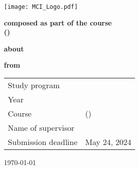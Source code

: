 
\thispagestyle{empty}
\thispdfpagelabel{} %
\begin{center}
	\textbf{\Huge \university}\par
	\vspace{8ex}\par
	\textbf{\LARGE \department}\par
	\vspace{4ex}\par
	\textbf{\Large \studyProgram}\par
	\vspace{4ex}\par
	\texttt{[image: MCI\_Logo.pdf]}\par
	\vspace{4ex}\par
	\textbf{\LARGE \docType}\par
	\vspace{2ex}\par
	\textbf{composed as part of the course\\[0.5ex] \courseName{} (\courseCode)}\par
	\vspace{4ex}\par
	\textbf{about}\par
	\vspace{4ex}\par
	\textbf{\LARGE \docTitle}\par
	\vspace{4ex}\par
	\textbf{from}\par
	\vspace{4ex}\par
	\textbf{\Large \href{\authorContact}{\authorName}}
\end{center}
\vspace{4ex}
\begin{tabular}{ll}
	Study program & \studyProgram\\[0.5ex]
	Year & \studyYear\\[0.5ex]
	Course & \courseName{} (\courseCode)\\[0.5ex]
	Name of supervisor & \href{\lecturerContact}{\supervisorName}\\[0.5ex]
	Submission deadline & May 24, 2024
\end{tabular}
\vfill
\begin{center}
	\today
\end{center}
